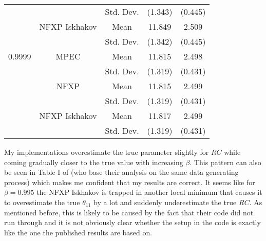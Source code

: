 \begin{table}[H]
\begin{tabular}{l c c c c}
		& & Std. Dev. & (1.343) & (0.445) \\
		& NFXP Iskhakov & Mean & 11.849 & 2.509 \\
		& & Std. Dev. & (1.342) & (0.445) \\ \midrule
		0.9999 & MPEC & Mean & 11.815 & 2.498 \\
		& & Std. Dev. & (1.319) & (0.431) \\
		& NFXP & Mean & 11.815 & 2.499 \\
		& & Std. Dev. & (1.319) & (0.431) \\
		& NFXP Iskhakov & Mean & 11.817	& 2.499 \\
		& & Std. Dev. & (1.319) & (0.431) \\ \bottomrule
	\end{tabular}
\end{table}

My implementations overestimate the true parameter slightly for $RC$ while coming gradually closer to the true value with increasing $\beta$. This pattern can also be seen in Table I of \cite{Su.Judd.2012} (who base their analysis on the same data generating process) which makes me confident that my results are correct. It seems like for $\beta = 0.995$ the NFXP Iskhakov is trapped in another local minimum that causes it to overestimate the true $\theta_{11}$ by a lot and suddenly underestimate the true $RC$. As mentioned before, this is likely to be caused by the fact that their code did not run through and it is not obviously clear whether the setup in the code is exactly like the one the published results are based on.